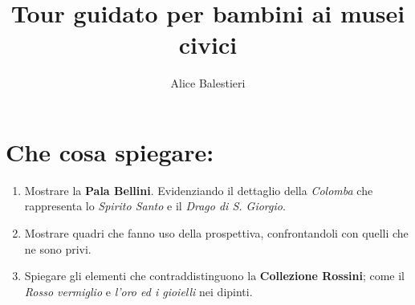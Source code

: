 \documentclass[12pt,a4paper]{article}
\begin{document}
\title{\textbf{Tour guidato per bambini ai musei civici}}
\author{Alice Balestieri}
\date{}

\maketitle
\newpage

\section{Che cosa spiegare:}

	\begin{enumerate}
	\item Mostrare la \textbf{Pala Bellini}. Evidenziando il dettaglio della \textit{Colomba} che rappresenta lo \textit{Spirito Santo} e il \textit{Drago di S. Giorgio}.
	\item Mostrare quadri che fanno uso della prospettiva, confrontandoli con quelli che ne sono privi.  
	\item Spiegare gli elementi che contraddistinguono la \textbf{Collezione Rossini}; come il \textit{Rosso vermiglio} e \textit{l'oro ed i gioielli} nei dipinti.
	
	\end{enumerate}
\end{document}
